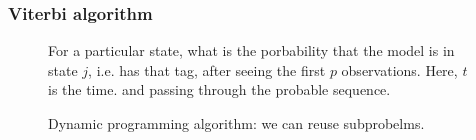 \documentclass[11pt]{article}
\begin{document}
\subsubsection{Viterbi algorithm}

\begin{figure}[H]
    \centering
    \caption{For a particular state, what is the porbability that the model is in state $j$, i.e. has that tag, after seeing the first $p$ observations. Here, $t$ is the time. and passing through the probable sequence.}
\end{figure}    

\begin{figure}[H]
    \centering
    \caption{Dynamic programming algorithm: we can reuse subprobelms.}
\end{figure}    
\end{document}
